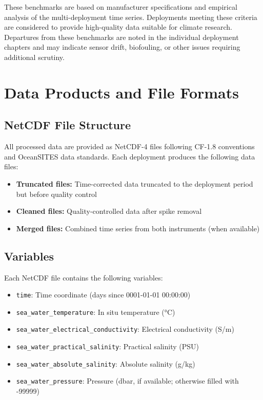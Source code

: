 These benchmarks are based on manufacturer specifications and empirical analysis of the multi-deployment time series. Deployments meeting these criteria are considered to provide high-quality data suitable for climate research. Departures from these benchmarks are noted in the individual deployment chapters and may indicate sensor drift, biofouling, or other issues requiring additional scrutiny.

\section{Data Products and File Formats}

\subsection{NetCDF File Structure}

All processed data are provided as NetCDF-4 files following CF-1.8 conventions and OceanSITES data standards. Each deployment produces the following data files:

\begin{itemize}
    \item \textbf{Truncated files:} Time-corrected data truncated to the deployment period but before quality control
    \item \textbf{Cleaned files:} Quality-controlled data after spike removal
    \item \textbf{Merged files:} Combined time series from both instruments (when available)
\end{itemize}

\subsection{Variables}

Each NetCDF file contains the following variables:

\begin{itemize}
    \item \texttt{time}: Time coordinate (days since 0001-01-01 00:00:00)
    \item \texttt{sea\_water\_temperature}: In situ temperature (°C)
    \item \texttt{sea\_water\_electrical\_conductivity}: Electrical conductivity (S/m)
    \item \texttt{sea\_water\_practical\_salinity}: Practical salinity (PSU)
    \item \texttt{sea\_water\_absolute\_salinity}: Absolute salinity (g/kg)
    \item \texttt{sea\_water\_pressure}: Pressure (dbar, if available; otherwise filled with -99999)
\end{itemize}

